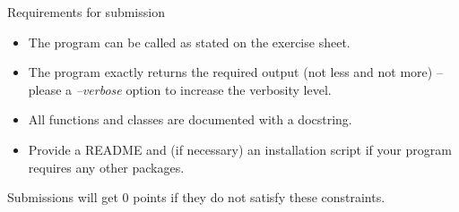 \documentclass[t,handout]{beamer}
\begin{document}
\begin{frame}[c]{Requirements for submission}

\begin{itemize}
  \item The program can be called as stated on the exercise sheet.
  \item The program exactly returns the required output (not less and not more) -- please a \emph{--verbose} option to increase the verbosity level.
  \item All functions and classes are documented with a docstring.
  \item Provide a README and (if necessary) an installation script if your program requires any other packages.
\end{itemize}

\bigskip

\alert{Submissions will get $0$ points if they do not satisfy these constraints.}

\end{frame}
% 
% 
% 
% 
\end{document}
